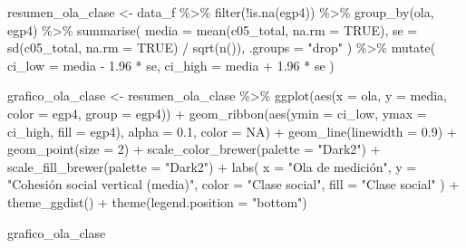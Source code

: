 \documentclass[
  spanish,
  a4paper,
  oneside]{scrbook}
\newenvironment{Shaded}{\begin{snugshade}}{\end{snugshade}}
\newcommand{\AttributeTok}[1]{\textcolor[rgb]{0.40,0.45,0.13}{#1}}
\newcommand{\ConstantTok}[1]{\textcolor[rgb]{0.56,0.35,0.01}{#1}}
\newcommand{\DecValTok}[1]{\textcolor[rgb]{0.68,0.00,0.00}{#1}}
\newcommand{\FloatTok}[1]{\textcolor[rgb]{0.68,0.00,0.00}{#1}}
\newcommand{\FunctionTok}[1]{\textcolor[rgb]{0.28,0.35,0.67}{#1}}
\newcommand{\NormalTok}[1]{\textcolor[rgb]{0.00,0.23,0.31}{#1}}
\newcommand{\OtherTok}[1]{\textcolor[rgb]{0.00,0.23,0.31}{#1}}
\newcommand{\SpecialCharTok}[1]{\textcolor[rgb]{0.37,0.37,0.37}{#1}}
\newcommand{\StringTok}[1]{\textcolor[rgb]{0.13,0.47,0.30}{#1}}
\begin{document}
\begin{Shaded}
\begin{Highlighting}[]
\NormalTok{resumen\_ola\_clase }\OtherTok{\textless{}{-}}\NormalTok{ data\_f }\SpecialCharTok{\%\textgreater{}\%}
  \FunctionTok{filter}\NormalTok{(}\SpecialCharTok{!}\FunctionTok{is.na}\NormalTok{(egp4)) }\SpecialCharTok{\%\textgreater{}\%}
  \FunctionTok{group\_by}\NormalTok{(ola, egp4) }\SpecialCharTok{\%\textgreater{}\%}
  \FunctionTok{summarise}\NormalTok{(}
    \AttributeTok{media   =} \FunctionTok{mean}\NormalTok{(c05\_total, }\AttributeTok{na.rm =} \ConstantTok{TRUE}\NormalTok{),}
    \AttributeTok{se      =} \FunctionTok{sd}\NormalTok{(c05\_total, }\AttributeTok{na.rm =} \ConstantTok{TRUE}\NormalTok{) }\SpecialCharTok{/} \FunctionTok{sqrt}\NormalTok{(}\FunctionTok{n}\NormalTok{()),}
    \AttributeTok{.groups =} \StringTok{"drop"}
\NormalTok{  ) }\SpecialCharTok{\%\textgreater{}\%}
  \FunctionTok{mutate}\NormalTok{(}
    \AttributeTok{ci\_low  =}\NormalTok{ media }\SpecialCharTok{{-}} \FloatTok{1.96} \SpecialCharTok{*}\NormalTok{ se,}
    \AttributeTok{ci\_high =}\NormalTok{ media }\SpecialCharTok{+} \FloatTok{1.96} \SpecialCharTok{*}\NormalTok{ se}
\NormalTok{  )}

\NormalTok{grafico\_ola\_clase }\OtherTok{\textless{}{-}}\NormalTok{ resumen\_ola\_clase }\SpecialCharTok{\%\textgreater{}\%}
  \FunctionTok{ggplot}\NormalTok{(}\FunctionTok{aes}\NormalTok{(}\AttributeTok{x =}\NormalTok{ ola, }\AttributeTok{y =}\NormalTok{ media, }\AttributeTok{color =}\NormalTok{ egp4, }\AttributeTok{group =}\NormalTok{ egp4)) }\SpecialCharTok{+}
  \FunctionTok{geom\_ribbon}\NormalTok{(}\FunctionTok{aes}\NormalTok{(}\AttributeTok{ymin =}\NormalTok{ ci\_low, }\AttributeTok{ymax =}\NormalTok{ ci\_high, }\AttributeTok{fill =}\NormalTok{ egp4),}
              \AttributeTok{alpha =} \FloatTok{0.1}\NormalTok{, }\AttributeTok{color =} \ConstantTok{NA}\NormalTok{) }\SpecialCharTok{+}
  \FunctionTok{geom\_line}\NormalTok{(}\AttributeTok{linewidth =} \FloatTok{0.9}\NormalTok{) }\SpecialCharTok{+}
  \FunctionTok{geom\_point}\NormalTok{(}\AttributeTok{size =} \DecValTok{2}\NormalTok{) }\SpecialCharTok{+}
  \FunctionTok{scale\_color\_brewer}\NormalTok{(}\AttributeTok{palette =} \StringTok{"Dark2"}\NormalTok{) }\SpecialCharTok{+}
  \FunctionTok{scale\_fill\_brewer}\NormalTok{(}\AttributeTok{palette =} \StringTok{"Dark2"}\NormalTok{) }\SpecialCharTok{+}
  \FunctionTok{labs}\NormalTok{(    }\AttributeTok{x =} \StringTok{"Ola de medición"}\NormalTok{,}
    \AttributeTok{y =} \StringTok{"Cohesión social vertical (media)"}\NormalTok{,}
    \AttributeTok{color =} \StringTok{"Clase social"}\NormalTok{,}
    \AttributeTok{fill  =} \StringTok{"Clase social"}
\NormalTok{  ) }\SpecialCharTok{+}
  \FunctionTok{theme\_ggdist}\NormalTok{() }\SpecialCharTok{+}
  \FunctionTok{theme}\NormalTok{(}\AttributeTok{legend.position =} \StringTok{"bottom"}\NormalTok{)}

\NormalTok{grafico\_ola\_clase}
\end{Highlighting}
\end{Shaded}
\end{document}
